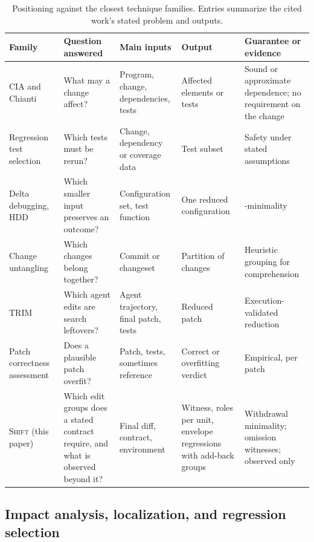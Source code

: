 \documentclass[a4paper,fleqn]{cas-sc}
\newcommand{\tool}{\textsc{Shift}}
\begin{document}
\begin{table}[pos=htbp]
\caption{Positioning against the closest technique families. Entries summarize the cited work's stated problem and outputs.}
\label{tab:related}
\centering\footnotesize
\begin{tabularx}{\textwidth}{>{\raggedright\arraybackslash}p{27mm}*{4}{>{\raggedright\arraybackslash}X}}
\toprule
Family & Question answered & Main inputs & Output & Guarantee or evidence \\
\midrule
CIA and Chianti~\citep{li2013cia,ren2004chianti} & What may a change affect? & Program, change, dependencies, tests & Affected elements or tests & Sound or approximate dependence; no requirement on the change \\
Regression test selection~\citep{rothermel1997safe,gligoric2015ekstazi} & Which tests must be rerun? & Change, dependency or coverage data & Test subset & Safety under stated assumptions \\
Delta debugging, HDD~\citep{zeller2002ddmin,misherghi2006hdd} & Which smaller input preserves an outcome? & Configuration set, test function & One reduced configuration & 1-minimality \\
Change untangling~\citep{herzig2013tangled,barnett2015untangle,dias2015untangling} & Which changes belong together? & Commit or changeset & Partition of changes & Heuristic grouping for comprehension \\
TRIM~\citep{mathai2026trim} & Which agent edits are search leftovers? & Agent trajectory, final patch, tests & Reduced patch & Execution-validated reduction \\
Patch correctness assessment~\citep{qi2015kali,wang2020apr} & Does a plausible patch overfit? & Patch, tests, sometimes reference & Correct or overfitting verdict & Empirical, per patch \\
\tool{} (this paper) & Which edit groups does a stated contract require, and what is observed beyond it? & Final diff, contract, environment & Witness, roles per unit, envelope regressions with add-back groups & Withdrawal minimality; omission witnesses; observed only \\
\bottomrule
\end{tabularx}
\end{table}

\subsection{Impact analysis, localization, and regression selection}
\end{document}
